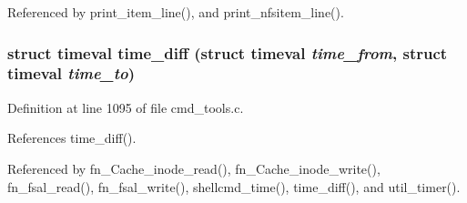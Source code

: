 Referenced by print\_\-item\_\-line(), and print\_\-nfsitem\_\-line().
\subsubsection{\setlength{\rightskip}{0pt plus 5cm}struct timeval time\_\-diff (struct timeval {\em time\_\-from}, struct timeval {\em time\_\-to})}\label{cmd__tools_8h_a24}




Definition at line 1095 of file cmd\_\-tools.c.

References time\_\-diff().

Referenced by fn\_\-Cache\_\-inode\_\-read(), fn\_\-Cache\_\-inode\_\-write(), fn\_\-fsal\_\-read(), fn\_\-fsal\_\-write(), shellcmd\_\-time(), time\_\-diff(), and util\_\-timer().
